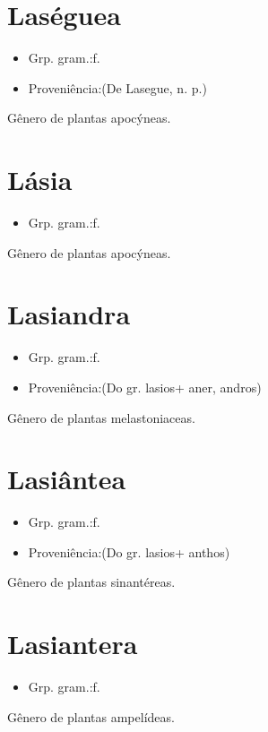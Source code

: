 \section{Laséguea}
\begin{itemize}
\item {Grp. gram.:f.}
\end{itemize}
\begin{itemize}
\item {Proveniência:(De \textunderscore Lasegue\textunderscore , n. p.)}
\end{itemize}
Gênero de plantas apocýneas.
\section{Lásia}
\begin{itemize}
\item {Grp. gram.:f.}
\end{itemize}
Gênero de plantas apocýneas.
\section{Lasiandra}
\begin{itemize}
\item {Grp. gram.:f.}
\end{itemize}
\begin{itemize}
\item {Proveniência:(Do gr. \textunderscore lasios\textunderscore  + \textunderscore aner\textunderscore , \textunderscore andros\textunderscore )}
\end{itemize}
Gênero de plantas melastoniaceas.
\section{Lasiântea}
\begin{itemize}
\item {Grp. gram.:f.}
\end{itemize}
\begin{itemize}
\item {Proveniência:(Do gr. \textunderscore lasios\textunderscore  + \textunderscore anthos\textunderscore )}
\end{itemize}
Gênero de plantas sinantéreas.
\section{Lasiantera}
\begin{itemize}
\item {Grp. gram.:f.}
\end{itemize}
Gênero de plantas ampelídeas.
